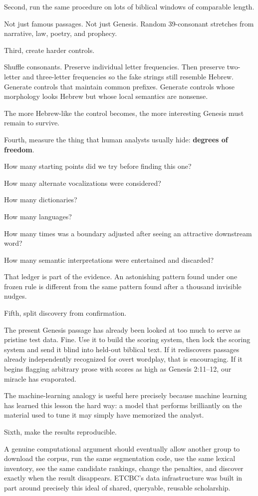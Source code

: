 Second, run the same procedure on lots of biblical windows of comparable length.

Not just famous passages. Not just Genesis. Random 39-consonant stretches from narrative, law, poetry, and prophecy.

Third, create harder controls.

Shuffle consonants. Preserve individual letter frequencies. Then preserve two-letter and three-letter frequencies so the fake strings still resemble Hebrew. Generate controls that maintain common prefixes. Generate controls whose morphology looks Hebrew but whose local semantics are nonsense.

The more Hebrew-like the control becomes, the more interesting Genesis must remain to survive.

Fourth, measure the thing that human analysts usually hide: \textbf{degrees of freedom}.

How many starting points did we try before finding this one?

How many alternate vocalizations were considered?

How many dictionaries?

How many languages?

How many times was a boundary adjusted after seeing an attractive downstream word?

How many semantic interpretations were entertained and discarded?

That ledger is part of the evidence. An astonishing pattern found under one frozen rule is different from the same pattern found after a thousand invisible nudges.

Fifth, split discovery from confirmation.

The present Genesis passage has already been looked at too much to serve as pristine test data. Fine. Use it to build the scoring system, then lock the scoring system and send it blind into held-out biblical text. If it rediscovers passages already independently recognized for overt wordplay, that is encouraging. If it begins flagging arbitrary prose with scores as high as Genesis 2:11--12, our miracle has evaporated.

The machine-learning analogy is useful here precisely because machine learning has learned this lesson the hard way: a model that performs brilliantly on the material used to tune it may simply have memorized the analyst.

Sixth, make the results reproducible.

A genuine computational argument should eventually allow another group to download the corpus, run the same segmentation code, use the same lexical inventory, see the same candidate rankings, change the penalties, and discover exactly when the result disappears. ETCBC's data infrastructure was built in part around precisely this ideal of shared, queryable, reusable scholarship.\cite{ETCBC}

